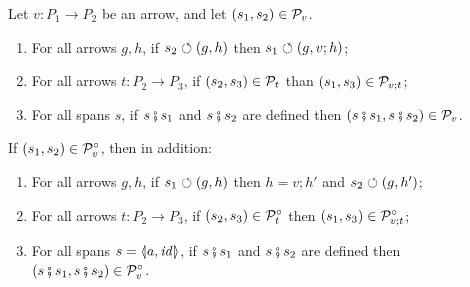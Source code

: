 \begin{proposition}
Let $v:P_1\to P_2$ be an arrow, and let $(s_1,s_2)\in \mathcal{P}_v$.
\begin{enumerate}[topsep=\smallskipamount]
\item\label{pattern-preserves} For all arrows $g,h$, if $s_2\circlearrowleft (g,h)$ then $s_1\circlearrowleft (g,v;h)$;
\item\label{pattern-transitive} For all arrows $t:P_2\to P_3$, if $(s_2,s_3)\in \mathcal{P}_t$ than  $(s_1,s_3)\in \mathcal{P}_{v;t}$;
\item\label{pattern-congruence} For all spans $s$, if $s\fatsemi s_1$ and $s \fatsemi s_2$ are defined then $(s\fatsemi s_1,s \fatsemi s_2)\in \mathcal{P}_v$.
\end{enumerate}
If $(s_1,s_2)\in \mathcal{P}^\circ_v$, then in addition:
\begin{enumerate}[resume,topsep=\smallskipamount]
\item\label{conservative-reflects} For all arrows $g,h$, if $s_1\circlearrowleft (g,h)$ then $h=v;h'$ and $s_2\circlearrowleft (g,h')$;
\item\label{conservative-transitive} For all arrows $t:P_2\to P_3$, if $(s_2,s_3)\in \mathcal{P}^\circ_t$ then $(s_1,s_3)\in \mathcal{P}^\circ_{v;t}$;
\item\label{conservative-congruence} For all spans $s=\spanof{a}{\id}$, if $s\fatsemi s_1$ and $s\fatsemi s_2$ are defined then $(s\fatsemi s_1,s\fatsemi s_2)\in \mathcal{P}^\circ_v$.
\end{enumerate}
\end{proposition}
%
